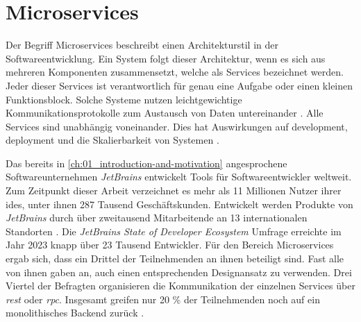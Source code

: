 \section{Microservices}
\label{sec:02-02_microservices}

Der Begriff Microservices beschreibt einen Architekturstil in der Softwareentwicklung. Ein System folgt dieser Architektur, wenn es sich aus mehreren Komponenten zusammensetzt, welche als Services bezeichnet werden. Jeder dieser Services ist verantwortlich für genau eine Aufgabe oder einen kleinen Funktionsblock. Solche Systeme nutzen leichtgewichtige Kommunikationsprotokolle zum Austausch von Daten untereinander \cite{027:Containerized-Microservices-Deployment-Approach}. Alle Services sind unabhängig voneinander. Dies hat Auswirkungen auf \Gls{development}, \Gls{deployment} und die Skalierbarkeit von Systemen \cite{028:Analyzing-Microservices-and-Monolithic-Systems}.

Das bereits in \autoref{ch:01_introduction-and-motivation} angesprochene Softwareunternehmen \textit{JetBrains} entwickelt Tools für Softwareentwickler weltweit. Zum Zeitpunkt dieser Arbeit verzeichnet es mehr als 11 Millionen Nutzer ihrer \Glspl{ide}, unter ihnen 287 Tausend Geschäftskunden. Entwickelt werden Produkte von \textit{JetBrains} durch über zweitausend Mitarbeitende an 13 internationalen Standorten \cite{210:Jet-Brains-Company}. Die \textit{JetBrains State of Developer Ecosystem} Umfrage erreichte im Jahr 2023 knapp über 23 Tausend Entwickler. Für den Bereich Microservices ergab sich, dass ein Drittel der Teilnehmenden an ihnen beteiligt sind. Fast alle von ihnen gaben an, auch einen entsprechenden Designansatz zu verwenden. Drei Viertel der Befragten organisieren die Kommunikation der einzelnen Services über \textit{\Gls{rest}} oder \textit{\Gls{rpc}}. Insgesamt greifen nur 20 \% der Teilnehmenden noch auf ein monolithisches Backend zurück \cite{207:Developer-Ecosystem}.

